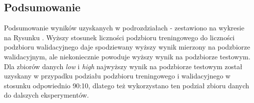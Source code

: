 \subsection{Podsumowanie}

Podsumowanie wyników uzyskanych w podrozdziałach - zestawiono na wykresie na Rysunku .
Wyższy stosunek liczności podzbioru treningowego do liczności podzbioru walidacyjnego daje spodziewany wyższy wynik mierzony na podzbiorze walidacyjnym, ale niekoniecznie powoduje wyższy wynik na podzbiorze testowym.
Dla zbiorów danych \textit{low} i \textit{high} najwyższy wynik na podzbiorze testowym został uzyskany w przypadku podziału podzbioru treningowego i walidacyjnego w stosunku odpowiednio 90:10, dlatego też wykorzystano ten podział zbioru danych do dalszych eksperymentów.

\splitsummarydata

\vspace{0.5cm}

